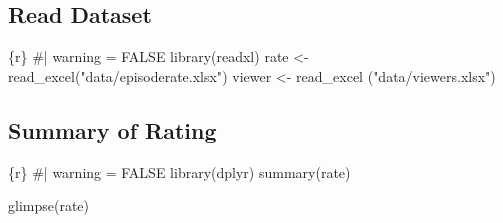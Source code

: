 \documentclass[
  letterpaper,
  DIV=11,
  numbers=noendperiod]{scrartcl}
\newenvironment{Shaded}{\begin{snugshade}}{\end{snugshade}}
\newcommand{\CommentTok}[1]{\textcolor[rgb]{0.37,0.37,0.37}{#1}}
\newcommand{\FunctionTok}[1]{\textcolor[rgb]{0.28,0.35,0.67}{#1}}
\newcommand{\InformationTok}[1]{\textcolor[rgb]{0.37,0.37,0.37}{#1}}
\newcommand{\NormalTok}[1]{\textcolor[rgb]{0.00,0.23,0.31}{#1}}
\newcommand{\OtherTok}[1]{\textcolor[rgb]{0.00,0.23,0.31}{#1}}
\newcommand{\StringTok}[1]{\textcolor[rgb]{0.13,0.47,0.30}{#1}}
\begin{document}
\hypertarget{read-dataset}{%
\subsection{Read Dataset}\label{read-dataset}}

\begin{Shaded}
\begin{Highlighting}[]
\InformationTok{\textasciigrave{}\textasciigrave{}\textasciigrave{}\{r\}}
\CommentTok{\#| warning = FALSE}
\FunctionTok{library}\NormalTok{(readxl)}
\NormalTok{rate }\OtherTok{\textless{}{-}} \FunctionTok{read\_excel}\NormalTok{(}\StringTok{"data/episoderate.xlsx"}\NormalTok{)}
\NormalTok{viewer }\OtherTok{\textless{}{-}} \FunctionTok{read\_excel}\NormalTok{ (}\StringTok{"data/viewers.xlsx"}\NormalTok{)}
\InformationTok{\textasciigrave{}\textasciigrave{}\textasciigrave{}}
\end{Highlighting}
\end{Shaded}

\hypertarget{summary-of-rating}{%
\subsection{Summary of Rating}\label{summary-of-rating}}

\begin{Shaded}
\begin{Highlighting}[]
\InformationTok{\textasciigrave{}\textasciigrave{}\textasciigrave{}\{r\}}
\CommentTok{\#| warning = FALSE}
\FunctionTok{library}\NormalTok{(dplyr) }
\FunctionTok{summary}\NormalTok{(rate)}

\FunctionTok{glimpse}\NormalTok{(rate)}
\InformationTok{\textasciigrave{}\textasciigrave{}\textasciigrave{}}
\end{Highlighting}
\end{Shaded}
\end{document}
